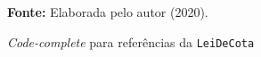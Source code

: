 \begin{figure}[ht!]
\centering

\caption{\textmd{\textit{Code-complete}} para referências da \texttt{LeiDeCota}}
\label{fig:codecomplete}

\par\medskip\textbf{Fonte:} Elaborada pelo autor (2020). \par\medskip

\end{figure}

